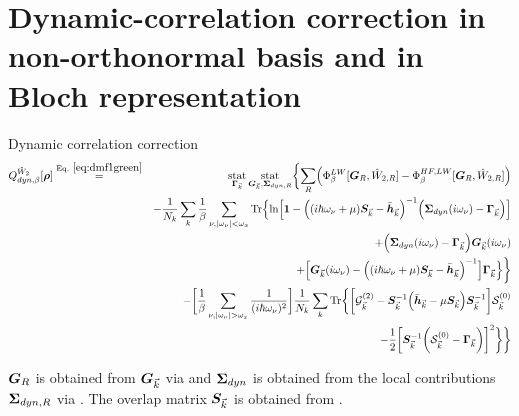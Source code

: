 \documentclass[11pt,a4paper]{report}
\begin{document}
\section{Dynamic-correlation correction in non-orthonormal basis and in Bloch representation}
\begin{myshadowminipage}{Dynamic correlation correction}
\begin{eqnarray}
Q^{\hat{W}_2}_{dyn,\beta}[\mat{\rho}] 
&\eqrel{eq:dmf1green}{=}&
\stat_{\mat{\Gamma}_{\vec{k}}}\stat_{\mat{G}_{\vec{k}},\mat{\Sigma}_{dyn,R}}\biggl\lbrace
\sum_R\Bigl(
\Phi^{LW}_\beta[\mat{G}_R,\hat{W}_{2,R}]
-\Phi^{HF,LW}_\beta[\mat{G}_R,\hat{W}_{2,R}]
\Bigr)
\nonumber\\ &&-\frac{1}{N_k}\sum_k
\frac{1}{\beta}\sum_{\nu,|\omega_\nu|<\omega_x}
\Tr\Bigl\lbrace \ln\Bigl[
  \mat{1}-
  \Bigl((i\hbar\omega_\nu+\mu)\mat{S}_{\vec{k}}-\bar{\mat{h}}_{\vec{k}}\Bigr)^{-1}
  \Bigl(\mat{\Sigma}_{dyn}(i\omega_\nu)-\mat{\Gamma}_{\vec{k}}\Bigr) \Bigr]
\nonumber\\
&&\hspace{3cm}
+\Bigl(\mat{\Sigma}_{dyn}(i\omega_\nu)-\mat{\Gamma}_{\vec{k}}\Bigr)
\mat{G}_{\vec{k}}(i\omega_\nu) 
\nonumber\\
&&\hspace{3cm}+
\Bigl[ \mat{G}_{\vec{k}}(i\omega_\nu)
  -\Bigl((i\hbar\omega_\nu+\mu)\mat{S}_{\vec{k}}
-\bar{\mat{h}}_{\vec{k}}\Bigr)^{-1} \Bigr]
\mat{\Gamma}_{\vec{k}}\Bigr\rbrace \biggr\rbrace 
\nonumber\\
&&-
\biggl[\frac{1}{\beta}\sum_{\nu,|\omega_\nu|>\omega_x}
\frac{1}{(i\hbar\omega_\nu)^2}\biggr]
\frac{1}{N_k}\sum_k
\Tr\biggl\lbrace
\biggl[
\mathcal{\mat{G}}^{(2)}_{\vec{k}}
-\mat{S}^{-1}_{\vec{k}}\Bigl(\bar{\mat{h}}_{\vec{k}}-\mu\mat{S}_{\vec{k}}\Bigr)\mat{S}^{-1}_{\vec{k}}
\biggr]
\mathcal{\mat{S}}^{(0)}_{\vec{k}}
\nonumber\\
&&\hspace{5cm}-
\frac{1}{2}
\biggl[
\mat{S}^{-1}_{\vec{k}}
\biggl(\mathcal{\mat{S}}^{(0)}_{\vec{k}}-\mat{\Gamma}_{\vec{k}}\biggr)
\biggr]^2\biggr\rbrace
\biggr\rbrace
\label{eq:dmf1greenb}
\end{eqnarray}

$\bm{G}_R$ is obtained from $\bm{G}_{\vec{k}}$ via
 and $\bm{\Sigma}_{dyn}$ is obtained from the
local contributions $\bm{\Sigma}_{dyn,R}$ via .
The overlap matrix $\bm{S}_{\vec{k}}$ is obtained from
.


\end{myshadowminipage}
\end{document}
